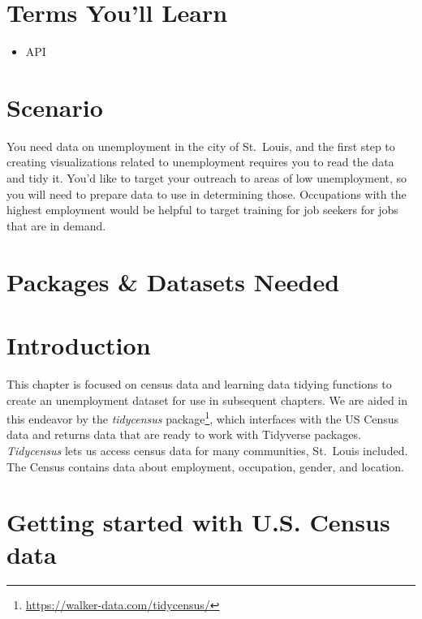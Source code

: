 \documentclass[
  krantz2]{krantz}
\providecommand{\tightlist}{%
  \setlength{\itemsep}{0pt}\setlength{\parskip}{0pt}}
\begin{document}
\hypertarget{dplyr-terms}{%
\section{Terms You'll Learn}\label{dplyr-terms}}

\begin{itemize}
\tightlist
\item
  API
\end{itemize}

\hypertarget{dplyr-scenario}{%
\section{Scenario}\label{dplyr-scenario}}

You need data on unemployment in the city of St.~Louis, and the first step to creating visualizations related to unemployment requires you to read the data and tidy it. You'd like to target your outreach to areas of low unemployment, so you will need to prepare data to use in determining those. Occupations with the highest employment would be helpful to target training for job seekers for jobs that are in demand.

\hypertarget{dplyr-pkgs}{%
\section{Packages \& Datasets Needed}\label{dplyr-pkgs}}

\hypertarget{dplyr-intro}{%
\section{Introduction}\label{dplyr-intro}}

This chapter is focused on census data and learning data tidying functions to create an unemployment dataset for use in subsequent chapters. We are aided in this endeavor by the \emph{tidycensus} package\footnote{\url{https://walker-data.com/tidycensus/}}, which interfaces with the US Census data and returns data that are ready to work with Tidyverse packages. \emph{Tidycensus} lets us access census data for many communities, St.~Louis included. The Census contains data about employment, occupation, gender, and location.

\hypertarget{census-setup}{%
\section{Getting started with U.S. Census data}\label{census-setup}}
\end{document}
